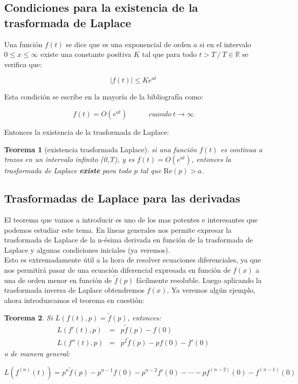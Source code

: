 \documentclass[12pt]{book}
\newcommand{\Real}{\mathrm{Re}}
\newcommand{\tquad}{\quad  \quad \quad}
\newtheorem{theorem}{Teorema}[section]
\begin{document}
\subsection{Condiciones para la existencia de la trasformada de Laplace} \label{Subsec:6.3.3}

Una función $f(t)$ se dice que es una exponencial de orden $a$ si en el intervalo $0 \leq x \leq \infty$ existe una constante positiva $K$ tal que para todo $t >  T \ / \ T \in \mathbb{R}$ se verifica que:

\begin{equation}
|f(t)| \leq K e^{at}
\end{equation}

Esta condición se escribe en la mayoría de la bibliografía como:

$$ f(t) = O(e^{at}) \tquad cuando \ t \rightarrow \infty $$

Entonces la existencia de la trasformada de Laplace:

\begin{theorem}[existencia trasformada Laplace]
si una función $f(t)$ es continua a trozos en un intervalo infinito (0,T), y es $f(t)=O(e^{at})$, entonces la trasformada de Laplace \textbf{existe} para todo $p$ tal que $\Real( p ) > a$.\\
\end{theorem} 


\subsection{Trasformadas de Laplace para las derivadas}

El teorema que vamos a introducir es uno de los mas potentes e interesantes que podemos estudiar este tema. En líneas generales nos permite expresar la trasformada de Laplace de la n-ésima derivada en función de la trasformada de Laplace y algunas condiciones iniciales (ya veremos). \\

Esto es extremadamente útil a la hora de resolver ecuaciones diferenciales, ya que nos permitirá pasar de una ecuación diferencial expresada en función de $f(x)$ a una de orden menor en función de $\tilde{f}(p)$ fácilmente resoluble. Luego aplicando la trasformada inversa de Laplace obtendremos $f(x)$. Ya veremos algún ejemplo, ahora introduzcamos el teorema en cuestión:

\begin{theorem}
Si $L(f(t),p) = \tilde{f}(p)$, entonces:
$$ \begin{array}{rll}  L(f'(t),p) & =  & p \tilde{f}(p)  - f(0) \\
L(f''(t),p) & = & p^2 \tilde{f}(p)-pf(0)-f'(0) \end{array} $$
o de manera general:

$$ L(f^{(n)} (t)) = p^n \tilde{f}(p) - p^{n-1} f(0) - p^{n-2} f'(0)- \cdots - pf^{(n-2)}(0) - f^{(n-1)}(0) $$\\
\end{theorem}
\end{document}
